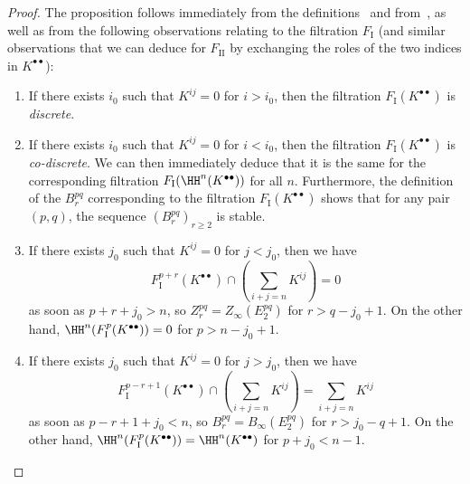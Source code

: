 \begin{proof}
The proposition follows immediately from the definitions~ and from~, as well as from the following observations relating to the filtration $F_\mathrm{I}$ (and similar observations that we can deduce for $F_\mathrm{II}$ by exchanging the roles of the two indices in $K^{\bullet\bullet}$):
\begin{enumerate}
  \item[{$1^{\circ}$}] If there exists $i_0$ such that $K^{ij}=0$ for $i>i_0$, then the filtration $F_\mathrm{I}(K^{\bullet\bullet})$ is \emph{discrete}.
  \item[{$2^{\circ}$}] If there exists $i_0$ such that $K^{ij}=0$ for $i<i_0$, then the filtration $F_\mathrm{I}(K^{\bullet\bullet})$ is \emph{co-discrete}.
    We can then immediately deduce that it is the same for the corresponding filtration $F_\mathrm{I}(\HH^n(K^{\bullet\bullet}))$ for all $n$.
    Furthermore, the definition of the $B_{r}^{pq}$ corresponding to the filtration $F_\mathrm{I}(K^{\bullet\bullet})$  shows that for any pair $(p,q)$, the sequence $(B_{r}^{pq})_{r\geq 2}$ is stable.
  \item[{$3^{\circ}$}] If there exists $j_0$ such that $K^{ij}=0$ for $j<j_0$, then we have 
    \[
      F_\mathrm{I}^{p+r}(K^{\bullet\bullet})
      \cap (\sum_{i+j=n}K^{ij})
      = 0
    \]
    as soon as $p+r+j_{0}>n$, so $Z_{r}^{pq} = Z_\infty(E_2^{pq})$ for $r>q-j_{0}+1$.
    On the other hand, $\HH^{n}(F_\mathrm{I}^{p}(K^{\bullet\bullet})) = 0$ for $p>n-j_{0}+1$.
  \item[{$4^{\circ}$}] If there exists $j_0$ such that $K^{ij}=0$ for $j>j_0$, then we have 
    \[
      F_\mathrm{I}^{p-r+1}(K^{\bullet\bullet})
      \cap (\sum_{i+j=n}K^{ij})
      = \sum_{i+j=n}K^{ij}
    \]
    as soon as $p-r+1+j_{0}<n$, so $B_{r}^{pq} = B_\infty(E_2^{pq})$ for $r>j_{0}-q+1$.
    On the other hand, $\HH^{n}(F_\mathrm{I}^{p}(K^{\bullet\bullet})) = \HH^{n}(K^{\bullet\bullet})$ for $p+j_{0}<n-1$.
\end{enumerate}
\end{proof}

